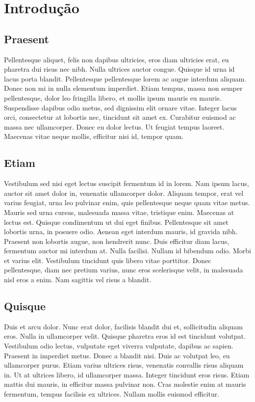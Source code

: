 \chapter{Introdução}
\section{Praesent}
Pellentesque aliquet, felis non dapibus ultricies, eros diam ultricies erat, eu pharetra dui risus nec nibh. Nulla ultrices auctor congue. Quisque id urna id lacus porta blandit. Pellentesque pellentesque lorem ac augue interdum aliquam. Donec non mi in nulla elementum imperdiet. Etiam tempus, massa non semper pellentesque, dolor leo fringilla libero, et mollis ipsum mauris eu mauris. Suspendisse dapibus odio metus, sed dignissim elit ornare vitae. Integer lacus orci, consectetur at lobortis nec, tincidunt sit amet ex. Curabitur euismod ac massa nec ullamcorper. Donec eu dolor lectus. Ut feugiat tempus laoreet. Maecenas vitae neque mollis, efficitur nisi id, tempor quam.

\section{Etiam}
Vestibulum sed nisi eget lectus suscipit fermentum id in lorem. Nam ipsum lacus, auctor sit amet dolor in, venenatis ullamcorper dolor. Aliquam tempor, erat vel varius feugiat, urna leo pulvinar enim, quis pellentesque neque quam vitae metus. Mauris sed urna cursus, malesuada massa vitae, tristique enim. Maecenas at lectus est. Quisque condimentum ut dui eget finibus. Pellentesque sit amet lobortis urna, in posuere odio. Aenean eget interdum mauris, id gravida nibh. Praesent non lobortis augue, non hendrerit nunc. Duis efficitur diam lacus, fermentum auctor mi interdum at. Nulla facilisi. Nullam id bibendum odio. Morbi et varius elit. Vestibulum tincidunt quis libero vitae porttitor. Donec pellentesque, diam nec pretium varius, nunc eros scelerisque velit, in malesuada nisl eros a enim. Nam sagittis vel risus a blandit.

\section{Quisque}
Duis et arcu dolor. Nunc erat dolor, facilisis blandit dui et, sollicitudin aliquam eros. Nulla in ullamcorper velit. Quisque pharetra eros id est tincidunt volutpat. Vestibulum odio lectus, vulputate eget viverra vulputate, dapibus ac sapien. Praesent in imperdiet metus. Donec a blandit nisi. Duis ac volutpat leo, eu ullamcorper purus. Etiam varius ultrices risus, venenatis convallis risus aliquam in. Ut at ultrices libero, id ullamcorper massa. Integer tincidunt eros risus. Etiam mattis dui mauris, in efficitur massa pulvinar non. Cras molestie enim at mauris fermentum, tempus facilisis ex ultrices. Nullam mollis euismod efficitur.
